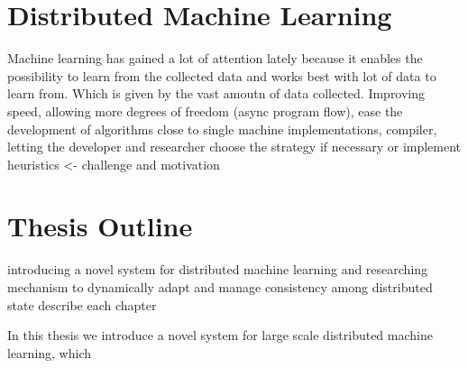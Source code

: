 \section{Distributed Machine Learning}
Machine learning has gained a lot of attention lately because it enables the possibility to learn from the collected data and works best with lot of data to learn from. Which is given by the vast amoutn of data collected. 
Improving speed, allowing more degrees of freedom (async program flow), ease the development of algorithms close to single machine implementations, compiler, letting the developer and researcher choose the strategy if necessary or implement heuristics <- challenge and motivation

\section{Thesis Outline}
introducing a novel system for distributed machine learning and researching mechanism to dynamically adapt and manage consistency among distributed state
describe each chapter

In this thesis we introduce a novel system for large scale distributed machine learning, which 